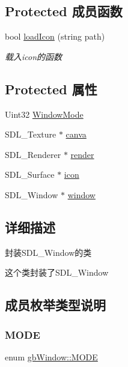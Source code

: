 \subsection*{Protected 成员函数}
\begin{DoxyCompactItemize}
\item 
bool \mbox{\hyperlink{classgb_window_a7afc7ded286b296fa5f2a324cbd065ff}{load\+Icon}} (string path)
\begin{DoxyCompactList}\small\item\em 载入icon的函数 \end{DoxyCompactList}\end{DoxyCompactItemize}
\subsection*{Protected 属性}
\begin{DoxyCompactItemize}
\item 
Uint32 \mbox{\hyperlink{classgb_window_a60b7748425bf49fdf563c870a13c6e07}{Window\+Mode}}
\item 
S\+D\+L\+\_\+\+Texture $\ast$ \mbox{\hyperlink{classgb_window_a03dded5e834b624a4e026b6c6e298606}{canva}}
\item 
S\+D\+L\+\_\+\+Renderer $\ast$ \mbox{\hyperlink{classgb_window_a8b83d44addf7721bb1c419dfdcd105ad}{render}}
\item 
S\+D\+L\+\_\+\+Surface $\ast$ \mbox{\hyperlink{classgb_window_ad6ff49981281025fd5b027277d693e24}{icon}}
\item 
S\+D\+L\+\_\+\+Window $\ast$ \mbox{\hyperlink{classgb_window_a1faf26696f9974e05cae77fb240a502e}{window}}
\end{DoxyCompactItemize}


\subsection{详细描述}
封装\+S\+D\+L\+\_\+\+Window的类 

这个类封装了\+S\+D\+L\+\_\+\+Window 

\subsection{成员枚举类型说明}
\mbox{\label{classgb_window_a19e70d277e17598ddb3c229e28dbb9e9}} 
\subsubsection{\texorpdfstring{MODE}{MODE}}
{\footnotesize\ttfamily enum \mbox{\hyperlink{classgb_window_a19e70d277e17598ddb3c229e28dbb9e9}{gb\+Window\+::\+M\+O\+DE}}}



